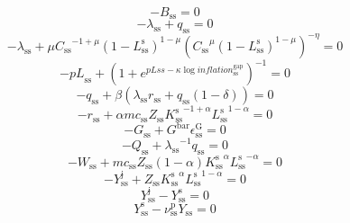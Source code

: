 \begin{equation}
-B_\mathrm{ss} = 0
\end{equation}
\begin{equation}
-\lambda_\mathrm{ss} + q_\mathrm{ss} = 0
\end{equation}
\begin{equation}
-\lambda_\mathrm{ss} + {\mu} {{C_\mathrm{ss}}^{-1 + \mu}} {\left(1 - L^{\mathrm{s}}_\mathrm{ss}\right)^{1 - \mu}} {\left({{C_\mathrm{ss}}^{\mu}} {\left(1 - L^{\mathrm{s}}_\mathrm{ss}\right)^{1 - \mu}}\right)^{-\eta}} = 0
\end{equation}
\begin{equation}
-{p\!L}_\mathrm{ss} + \left(1 + e^{{p\!L\!s\!s} - {\kappa} {\log{{i\!n\!f\!l\!a\!t\!i\!o\!n}^{\mathrm{gap}}_\mathrm{ss}}}}\right)^{-1} = 0
\end{equation}
\begin{equation}
-q_\mathrm{ss} + {\beta} \left({\lambda_\mathrm{ss}} {r_\mathrm{ss}} + {q_\mathrm{ss}} \left(1 - \delta\right)\right) = 0
\end{equation}
\begin{equation}
-r_\mathrm{ss} + {\alpha} {{m\!c}_\mathrm{ss}} {Z_\mathrm{ss}} {{K^{\mathrm{s}}_\mathrm{ss}}^{-1 + \alpha}} {{L^{\mathrm{s}}_\mathrm{ss}}^{1 - \alpha}} = 0
\end{equation}
\begin{equation}
-G_\mathrm{ss} + {G^{\mathrm{bar}}} {\epsilon^{\mathrm{G}}_\mathrm{ss}} = 0
\end{equation}
\begin{equation}
-Q_\mathrm{ss} + {\lambda_\mathrm{ss}}^{-1} {q_\mathrm{ss}} = 0
\end{equation}
\begin{equation}
-W_\mathrm{ss} + {{m\!c}_\mathrm{ss}} {Z_\mathrm{ss}} \left(1 - \alpha\right) {{K^{\mathrm{s}}_\mathrm{ss}}^{\alpha}} {{L^{\mathrm{s}}_\mathrm{ss}}^{-\alpha}} = 0
\end{equation}
\begin{equation}
-Y^{\mathrm{j}}_\mathrm{ss} + {Z_\mathrm{ss}} {{K^{\mathrm{s}}_\mathrm{ss}}^{\alpha}} {{L^{\mathrm{s}}_\mathrm{ss}}^{1 - \alpha}} = 0
\end{equation}
\begin{equation}
Y^{\mathrm{j}}_\mathrm{ss} - Y^{\mathrm{s}}_\mathrm{ss} = 0
\end{equation}
\begin{equation}
Y^{\mathrm{s}}_\mathrm{ss} - {\nu^{\mathrm{p}}_\mathrm{ss}} {Y_\mathrm{ss}} = 0
\end{equation}
